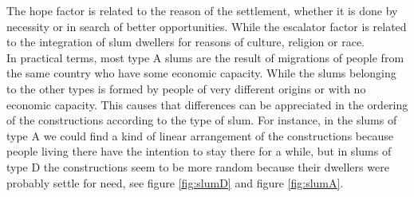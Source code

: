 \documentclass[10pt]{article}
\begin{document}
The hope factor is related to the reason of the settlement, whether it is done by necessity or in search of better opportunities. While the escalator factor is related to the integration of slum dwellers for reasons of culture, religion or race.\\

In practical terms, most type A slums are the result of migrations of people from the same country who have some economic capacity. While the slums belonging to the other types is formed by people of very different origins or with no economic capacity. This causes that differences can be appreciated in the ordering of the constructions according to the type of slum. For instance, in the slums of type A we could find a kind of linear arrangement of the constructions because people living there have the intention to stay there for a while, but in slums of type D the constructions seem to be more random because their dwellers were probably settle for need, see figure \ref{fig:slumD} and figure \ref{fig:slumA}.\\ 
\end{document}
